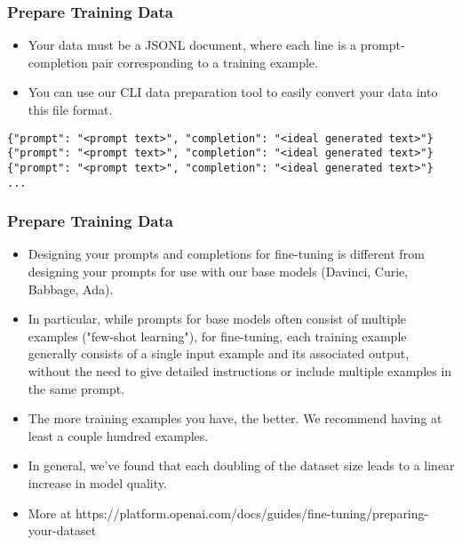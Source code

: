 \begin{frame}[fragile]\frametitle{Prepare Training Data}

\begin{itemize}
\item Your data must be a JSONL document, where each line is a prompt-completion pair corresponding to a training example. 
\item You can use our CLI data preparation tool to easily convert your data into this file format.
\end{itemize}	 

\begin{lstlisting}
{"prompt": "<prompt text>", "completion": "<ideal generated text>"}
{"prompt": "<prompt text>", "completion": "<ideal generated text>"}
{"prompt": "<prompt text>", "completion": "<ideal generated text>"}
...
\end{lstlisting}	 

\end{frame}


\begin{frame}[fragile]\frametitle{Prepare Training Data}

\begin{itemize}
\item Designing your prompts and completions for fine-tuning is different from designing your prompts for use with our base models (Davinci, Curie, Babbage, Ada). 
\item In particular, while prompts for base models often consist of multiple examples ("few-shot learning"), for fine-tuning, each training example generally consists of a single input example and its associated output, without the need to give detailed instructions or include multiple examples in the same prompt.
\item The more training examples you have, the better. We recommend having at least a couple hundred examples. 
\item In general, we've found that each doubling of the dataset size leads to a linear increase in model quality.
\item More at https://platform.openai.com/docs/guides/fine-tuning/preparing-your-dataset
\end{itemize}	 


\end{frame}


